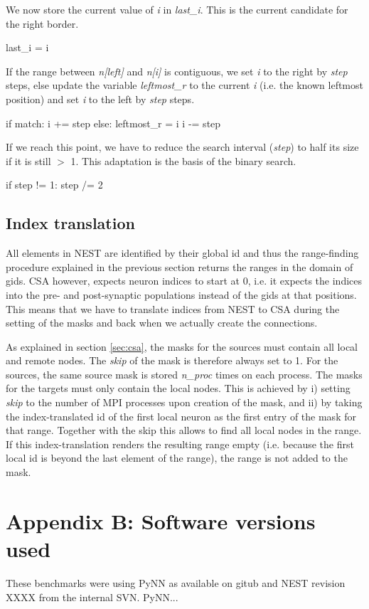 \documentclass{frontiersSCNS} %
\begin{document}
We now store the current value of \emph{i} in \emph{last\_i}. This is
the current candidate for the right border.

\begin{pythoncode}
        last_i = i 
\end{pythoncode}

If the range between \emph{n[left]} and \emph{n[i]} is contiguous, we
set \emph{i} to the right by \emph{step} steps, else update the
variable \emph{leftmost\_r} to the current \emph{i} (i.e. the known
leftmost position) and set \emph{i} to the left by \emph{step} steps.

\begin{pythoncode}
        if match:
            i += step
        else:
            leftmost_r = i
            i -= step
\end{pythoncode}

If we reach this point, we have to reduce the search interval
(\emph{step}) to half its size if it is still $>$ 1. This adaptation
is the basis of the binary search.

\begin{pythoncode}
        if step != 1:
            step /= 2
\end{pythoncode}

\subsection*{Index translation}

All elements in NEST are identified by their global id and thus the
range-finding procedure explained in the previous section returns the
ranges in the domain of gids. CSA however, expects neuron indices to
start at 0, i.e. it expects the indices into the pre- and
post-synaptic populations instead of the gids at that positions. This
means that we have to translate indices from NEST to CSA during the
setting of the masks and back when we actually create the connections.

As explained in section \ref{sec:csa}, the masks for the sources must
contain all local and remote nodes. The \emph{skip} of the mask is
therefore always set to 1. For the sources, the same source mask is
stored \emph{n\_proc} times on each process. The masks for the targets
must only contain the local nodes. This is achieved by i) setting
\emph{skip} to the number of MPI processes upon creation of the mask,
and ii) by taking the index-translated id of the first local neuron as
the first entry of the mask for that range. Together with the skip
this allows to find all local nodes in the range. If this
index-translation renders the resulting range empty (i.e. because the
first local id is beyond the last element of the range), the range is
not added to the mask.

\section*{Appendix B: Software versions used}

These benchmarks were using PyNN as available on gitub and NEST
revision XXXX from the internal SVN. PyNN...




\end{document}
